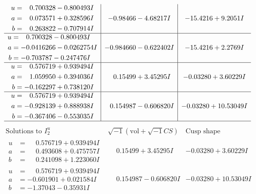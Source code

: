 \documentclass[1p]{elsarticle_modified}
\theoremstyle{definition}
\newcommand{\I}{\sqrt{-1}}
\begin{document}
$$\begin{array}{c|c|c}
\begin{aligned}
u &= \phantom{-}0.700328 - 0.800493 I \\
a &= \phantom{-}0.073571 + 0.328596 I \\
b &= \phantom{-}0.263822 - 0.707914 I\end{aligned}
 & -0.98466 - 4.68217 I & -15.4216 + 9.2051 I \\ \hline\begin{aligned}
u &= \phantom{-}0.700328 - 0.800493 I \\
a &= -0.0416266 - 0.0262754 I \\
b &= -0.703787 - 0.247476 I\end{aligned}
 & -0.984660 - 0.622402 I & -15.4216 + 2.2769 I \\ \hline\begin{aligned}
u &= \phantom{-}0.576719 + 0.939494 I \\
a &= \phantom{-}1.059950 + 0.394036 I \\
b &= -0.162297 + 0.738120 I\end{aligned}
 & \phantom{-}0.15499 + 3.45295 I & -0.03280 + 3.60229 I \\ \hline\begin{aligned}
u &= \phantom{-}0.576719 + 0.939494 I \\
a &= -0.928139 + 0.888938 I \\
b &= -0.367406 - 0.553035 I\end{aligned}
 & \phantom{-}0.154987 - 0.606820 I & -0.03280 + 10.53049 I\\
 \hline 
 \end{array}$$\newpage$$\begin{array}{c|c|c}  
\text{Solutions to }I^u_{2}& \I (\text{vol} + \sqrt{-1}CS) & \text{Cusp shape}\\
 \hline 
\begin{aligned}
u &= \phantom{-}0.576719 + 0.939494 I \\
a &= \phantom{-}0.493608 + 0.475757 I \\
b &= \phantom{-}0.241098 + 1.223060 I\end{aligned}
 & \phantom{-}0.15499 + 3.45295 I & -0.03280 + 3.60229 I \\ \hline\begin{aligned}
u &= \phantom{-}0.576719 + 0.939494 I \\
a &= -0.601901 + 0.021584 I \\
b &= -1.37043 - 0.35931 I\end{aligned}
 & \phantom{-}0.154987 - 0.606820 I & -0.03280 + 10.53049 I \\ \hline\begin{aligned}

\end{aligned}
\end{array}$$
\end{document}
